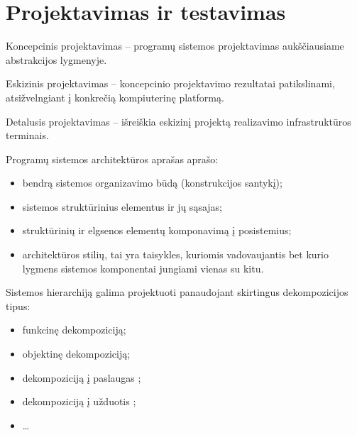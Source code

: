 \section{Projektavimas ir testavimas}


Koncepcinis projektavimas – programų sistemos projektavimas aukščiausiame
abstrakcijos lygmenyje.

Eskizinis projektavimas – koncepcinio projektavimo rezultatai patikslinami,
atsižvelngiant į konkrečią kompiuterinę platformą.

Detalusis projektavimas – išreiškia eskizinį projektą realizavimo
infrastruktūros terminais.

Programų sistemos architektūros aprašas aprašo:
\begin{itemize}
  \item bendrą sistemos organizavimo būdą (konstrukcijos santykį);
  \item sistemos struktūrinius elementus ir jų sąsajas;
  \item struktūrinių ir elgsenos elementų komponavimą į posistemius;
  \item architektūros stilių, tai yra taisykles, kuriomis vadovaujantis
    bet kurio lygmens sistemos komponentai jungiami vienas su kitu.
\end{itemize}


Sistemos hierarchiją galima projektuoti panaudojant skirtingus 
dekompozicijos tipus:
\begin{itemize}
  \item funkcinę dekompoziciją;
  \item objektinę dekompoziciją;
  \item dekompoziciją į paslaugas ;
  \item dekompoziciją į užduotis ;
  \item …
\end{itemize}
